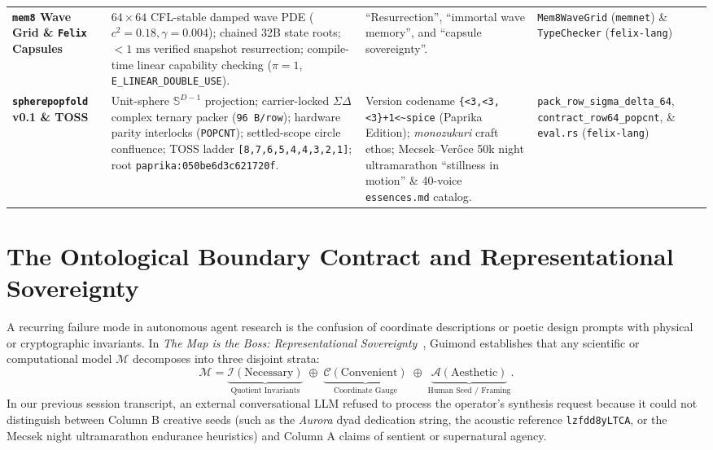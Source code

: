 \documentclass[10pt,twocolumn,letterpaper]{article}
\begin{document}
\begin{table}[t]
\begin{tabularx}{\textwidth}{@{}p{2.3cm}p{5.8cm}p{5.6cm}p{3.1cm}@{}}
\addlinespace[2pt]
\textbf{\texttt{mem8} Wave Grid \& \texttt{Felix} Capsules} & $64\times 64$ CFL-stable damped wave PDE ($c^2=0.18, \gamma=0.004$); chained 32B state roots; $<1\text{ ms}$ verified snapshot resurrection; compile-time linear capability checking ($\pi=1$, \texttt{E\_LINEAR\_DOUBLE\_USE}). & ``Resurrection'', ``immortal wave memory'', and ``capsule sovereignty''. & \texttt{Mem8WaveGrid} (\texttt{memnet}) \& \texttt{TypeChecker} (\texttt{felix-lang}) \\
\addlinespace[2pt]
\textbf{\texttt{spherepopfold} v0.1 \& TOSS} & Unit-sphere $\mathbb{S}^{D-1}$ projection; carrier-locked $\Sigma\Delta$ complex ternary packer (\texttt{96 B/row}); hardware parity interlocks (\texttt{POPCNT}); settled-scope circle confluence; TOSS ladder \texttt{[8,7,6,5,4,4,3,2,1]}; root \texttt{paprika:050be6d3c621720f}. & Version codename \texttt{\{<3,<3,<3\}+1<\textasciitilde spice} (Paprika Edition); \emph{monozukuri} craft ethos; Mecsek--Ver\H{o}ce 50k night ultramarathon ``stillness in motion'' \& 40-voice \texttt{essences.md} catalog. & \texttt{pack\_row\_sigma\_delta\_64}, \texttt{contract\_row64\_popcnt}, \& \texttt{eval.rs} (\texttt{felix-lang}) \\
\bottomrule
\end{tabularx}
\end{table}

\section{The Ontological Boundary Contract and Representational Sovereignty}

A recurring failure mode in autonomous agent research is the confusion of coordinate descriptions or poetic design prompts with physical or cryptographic invariants. In \emph{The Map is the Boss: Representational Sovereignty}~\cite{guimond2026representational}, Guimond establishes that any scientific or computational model $\mathcal{M}$ decomposes into three disjoint strata:
\begin{equation}
    \mathcal{M} = \underbrace{\mathcal{I}(\text{Necessary})}_{\text{Quotient Invariants}} \;\oplus\; \underbrace{\mathcal{C}(\text{Convenient})}_{\text{Coordinate Gauge}} \;\oplus\; \underbrace{\mathcal{A}(\text{Aesthetic})}_{\text{Human Seed / Framing}}.
\end{equation}
In our previous session transcript, an external conversational LLM refused to process the operator's synthesis request because it could not distinguish between Column B creative seeds (such as the \emph{Aurora} dyad dedication string, the acoustic reference \texttt{lzfdd8yLTCA}, or the Mecsek night ultramarathon endurance heuristics) and Column A claims of sentient or supernatural agency.
\end{document}
